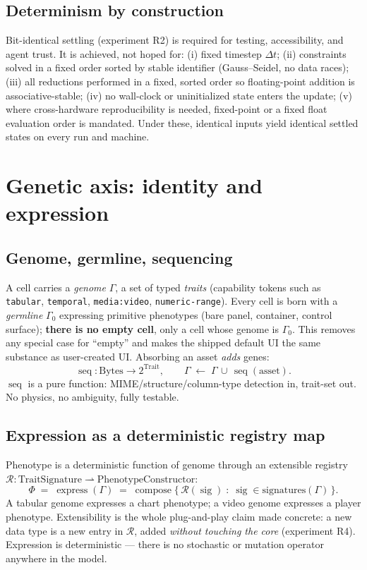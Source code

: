\documentclass[11pt]{article}
\DeclareMathOperator{\express}{express}
\DeclareMathOperator{\seq}{seq}
\DeclareMathOperator{\sig}{sig}
\DeclareMathOperator{\compose}{compose}
\newcommand{\R}{\mathcal{R}}
\newcommand{\Gnome}{\Gamma}
\newcommand{\Phe}{\Phi}
\newcommand{\dt}{\Delta t}
\begin{document}
\subsection{Determinism by construction}\label{sec:determinism}
Bit-identical settling (experiment R2) is required for testing, accessibility, and agent trust.
It is achieved, not hoped for: (i) fixed timestep $\dt$; (ii) constraints solved in a fixed order
sorted by stable identifier (Gauss--Seidel, no data races); (iii) all reductions performed in a
fixed, sorted order so floating-point addition is associative-stable; (iv) no wall-clock or
uninitialized state enters the update; (v) where cross-hardware reproducibility is needed,
fixed-point or a fixed float evaluation order is mandated. Under these, identical inputs yield
identical settled states on every run and machine.

\section{Genetic axis: identity and expression}\label{sec:genetic}

\subsection{Genome, germline, sequencing}
A cell carries a \emph{genome} $\Gnome$, a set of typed \emph{traits} (capability tokens such as
\texttt{tabular}, \texttt{temporal}, \texttt{media:video}, \texttt{numeric-range}). Every cell
is born with a \emph{germline} $\Gnome_0$ expressing primitive phenotypes (bare panel, container,
control surface); \textbf{there is no empty cell}, only a cell whose genome is $\Gnome_0$. This
removes any special case for ``empty'' and makes the shipped default UI the same substance as
user-created UI. Absorbing an asset \emph{adds} genes:
\begin{equation}
\seq : \text{Bytes} \to 2^{\text{Trait}}, \qquad
\Gnome \;\gets\; \Gnome \,\cup\, \seq(\text{asset}).
\end{equation}
$\seq$ is a pure function: MIME/structure/column-type detection in, trait-set out. No physics,
no ambiguity, fully testable.

\subsection{Expression as a deterministic registry map}
Phenotype is a deterministic function of genome through an extensible registry
$\R:\text{TraitSignature}\rightharpoonup\text{PhenotypeConstructor}$:
\begin{equation}
\Phe \;=\; \express(\Gnome) \;=\; \compose\big\{\,\R(\sig)\;:\;\sig\in\text{signatures}(\Gnome)\,\big\}.
\end{equation}
A tabular genome expresses a chart phenotype; a video genome expresses a player phenotype.
Extensibility is the whole plug-and-play claim made concrete: a new data type is a new entry in
$\R$, added \emph{without touching the core} (experiment R4). Expression is deterministic ---
there is no stochastic or mutation operator anywhere in the model.
\end{document}
